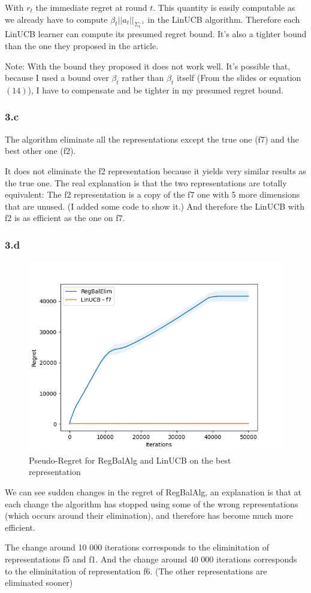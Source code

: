 \documentclass[a4paper]{article}
\begin{document}
With $r_t$ the immediate regret at round $t$. This quantity is easily computable as we already have to compute $\beta_t ||a_t||_{\Sigma_t^{-1}}$
in the LinUCB algorithm. Therefore each LinUCB learner can compute its presumed regret bound. It's also a tighter bound than the one they
proposed in the article.

Note: With the bound they proposed it does not work well. It's possible that, because I used a bound over $\beta_t$ rather than
$\beta_t$ itself (From the slides or equation $(14)$), I have to compensate and be tighter in my presumed regret bound.


\subsubsection*{3.c}
The algorithm eliminate all the representations except the true one (f7) and the best other one (f2).

It does not eliminate the f2 representation because it yields very similar results as the true one. The real explanation is that
the two representations are totally equivalent: The f2 representation is a copy of the f7 one with 5 more dimensions that are unused. (I added
some code to show it.) And therefore the LinUCB with f2 is as efficient as the one on f7.

\subsubsection*{3.d}

\begin{figure}[h!]
   \includegraphics[width=0.8\linewidth]{images/regret2}
   \caption{Pseudo-Regret for RegBalAlg and LinUCB on the best representation}
   \label{fig:regret2}
\end{figure}

We can see sudden changes in the regret of RegBalAlg, an explanation is that at each change the algorithm has stopped using some of the wrong
representations (which occurs around their elimination), and therefore has become much more efficient.

The change around 10 000 iterations corresponds to the eliminitation of representations f5 and f1. And the change around 40 000 iterations
corresponds to the eliminitation of representation f6. (The other representations are eliminated sooner)




\end{document}
